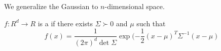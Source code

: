 

We generalize the Gaussian
to $n$-dimensional space.


$f: R^d \to R$ is a 
if there exists $\Sigma \succ 0$
and $\mu$ such that
\[
  f(x) = \frac{1}{(2\pi)^d \det \Sigma}
  \exp(-\frac{1}{2} (x - \mu)^T \Sigma^{-1} (x - \mu)
\]
